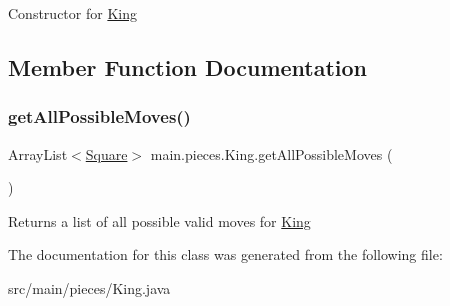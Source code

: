 Constructor for \hyperlink{classmain_1_1pieces_1_1_king}{King} 

\subsection{Member Function Documentation}
\mbox{\label{classmain_1_1pieces_1_1_king_a428c7c1471621c2abb8e9f085ac17f9d}} 
\subsubsection{\texorpdfstring{get\+All\+Possible\+Moves()}{getAllPossibleMoves()}}
{\footnotesize\ttfamily Array\+List$<$\hyperlink{classmain_1_1_square}{Square}$>$ main.\+pieces.\+King.\+get\+All\+Possible\+Moves (\begin{DoxyParamCaption}{ }\end{DoxyParamCaption})\hspace{0.3cm}{\ttfamily [inline]}}

Returns a list of all possible valid moves for \hyperlink{classmain_1_1pieces_1_1_king}{King} 

The documentation for this class was generated from the following file\+:\begin{DoxyCompactItemize}
\item 
src/main/pieces/King.\+java\end{DoxyCompactItemize}

